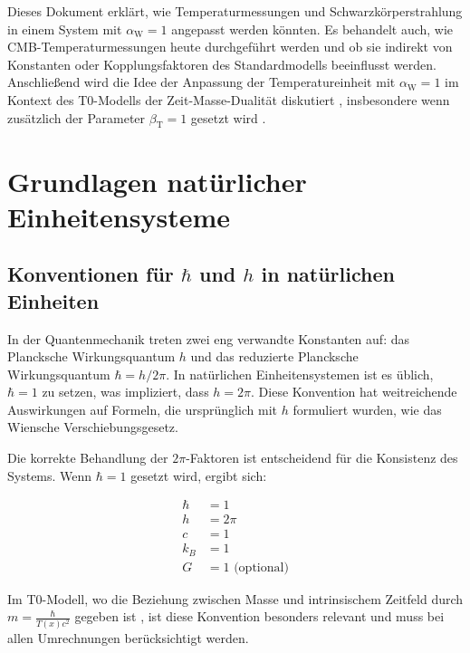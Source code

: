 \documentclass[12pt,a4paper]{article}
\newcommand{\Tfield}{T(x)}
\newcommand{\betaT}{\beta_{\text{T}}}
\newcommand{\alphaW}{\alpha_{\text{W}}}
\begin{document}
	Dieses Dokument erklärt, wie Temperaturmessungen und Schwarzkörperstrahlung in einem System mit \(\alphaW = 1\) angepasst werden könnten. Es behandelt auch, wie CMB-Temperaturmessungen heute durchgeführt werden und ob sie indirekt von Konstanten oder Kopplungsfaktoren des Standardmodells beeinflusst werden. Anschließend wird die Idee der Anpassung der Temperatureinheit mit \(\alphaW = 1\) im Kontext des T0-Modells der Zeit-Masse-Dualität diskutiert \cite{pascher_galaxies_2025}, insbesondere wenn zusätzlich der Parameter \(\betaT = 1\) gesetzt wird \cite{pascher_params_2025}.
	
	\section{Grundlagen natürlicher Einheitensysteme}
	
	\subsection{Konventionen für \(\hbar\) und \(h\) in natürlichen Einheiten}
	
	In der Quantenmechanik treten zwei eng verwandte Konstanten auf: das Plancksche Wirkungsquantum \(h\) und das reduzierte Plancksche Wirkungsquantum \(\hbar = h/2\pi\). In natürlichen Einheitensystemen ist es üblich, \(\hbar = 1\) zu setzen, was impliziert, dass \(h = 2\pi\). Diese Konvention hat weitreichende Auswirkungen auf Formeln, die ursprünglich mit \(h\) formuliert wurden, wie das Wiensche Verschiebungsgesetz.
	
	Die korrekte Behandlung der \(2\pi\)-Faktoren ist entscheidend für die Konsistenz des Systems. Wenn \(\hbar = 1\) gesetzt wird, ergibt sich:
	
	\begin{tcolorbox}[colback=blue!5!white,colframe=blue!75!black,title=Konventionen in natürlichen Einheiten]
		\begin{align}
			\hbar &= 1 \\
			h &= 2\pi \\
			c &= 1 \\
			k_B &= 1 \\
			G &= 1 \text{ (optional)}
		\end{align}
	\end{tcolorbox}
	
	Im T0-Modell, wo die Beziehung zwischen Masse und intrinsischem Zeitfeld durch \(m = \frac{\hbar}{\Tfield c^2}\) gegeben ist \cite{pascher_galaxies_2025}, ist diese Konvention besonders relevant und muss bei allen Umrechnungen berücksichtigt werden.
	
\end{document}
